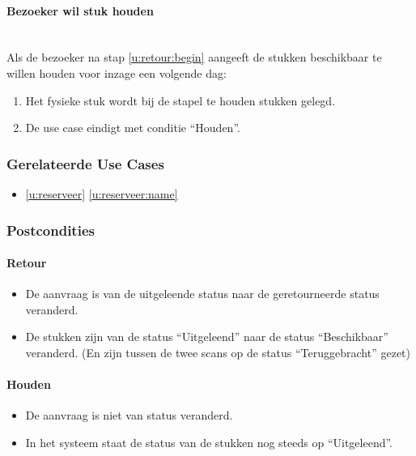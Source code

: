 \documentclass[a4paper,titlepage]{report}
\def\namedref#1{\ref{#1} \ref{#1:name}}
\begin{document}
        \paragraph{Bezoeker wil stuk houden}\hfill\\
          Als de bezoeker na stap \ref{u:retour:begin} aangeeft de stukken
          beschikbaar te willen houden voor inzage een volgende dag:
          \begin{enumerate}
            \item Het fysieke stuk wordt bij de stapel te houden stukken
              gelegd.
            \item De use case eindigt met conditie ``Houden''.
          \end{enumerate}
      \subsubsection{Gerelateerde Use Cases}
        \begin{itemize}
          \item \namedref{u:reserveer}
        \end{itemize}
      \subsubsection{Postcondities}
        \paragraph{Retour}
        \begin{itemize}
          \item De aanvraag is van de uitgeleende status naar de
            geretourneerde status veranderd.
          \item De stukken zijn van de status ``Uitgeleend'' naar de
            status ``Beschikbaar'' veranderd. (En zijn tussen de twee scans op
            de status ``Teruggebracht'' gezet)
        \end{itemize}

        \paragraph{Houden}
        \begin{itemize}
          \item De aanvraag is niet van status veranderd.
          \item In het systeem staat de status van de stukken nog steeds op
          ``Uitgeleend''.
        \end{itemize}
\end{document}
